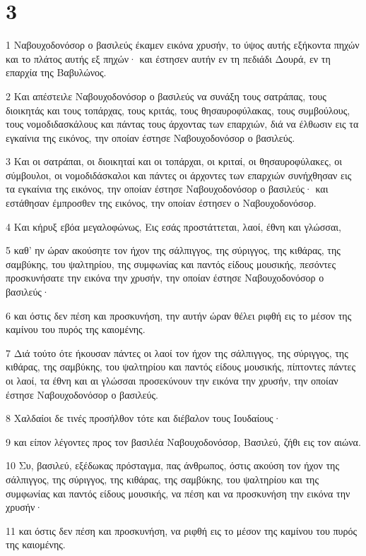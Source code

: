 \chapter{3}

\par 1 Ναβουχοδονόσορ ο βασιλεύς έκαμεν εικόνα χρυσήν, το ύψος αυτής εξήκοντα πηχών και το πλάτος αυτής εξ πηχών· και έστησεν αυτήν εν τη πεδιάδι Δουρά, εν τη επαρχία της Βαβυλώνος.
\par 2 Και απέστειλε Ναβουχοδονόσορ ο βασιλεύς να συνάξη τους σατράπας, τους διοικητάς και τους τοπάρχας, τους κριτάς, τους θησαυροφύλακας, τους συμβούλους, τους νομοδιδασκάλους και πάντας τους άρχοντας των επαρχιών, διά να έλθωσιν εις τα εγκαίνια της εικόνος, την οποίαν έστησε Ναβουχοδονόσορ ο βασιλεύς.
\par 3 Και οι σατράπαι, οι διοικηταί και οι τοπάρχαι, οι κριταί, οι θησαυροφύλακες, οι σύμβουλοι, οι νομοδιδάσκαλοι και πάντες οι άρχοντες των επαρχιών συνήχθησαν εις τα εγκαίνια της εικόνος, την οποίαν έστησε Ναβουχοδονόσορ ο βασιλεύς· και εστάθησαν έμπροσθεν της εικόνος, την οποίαν έστησεν ο Ναβουχοδονόσορ.
\par 4 Και κήρυξ εβόα μεγαλοφώνως, Εις εσάς προστάττεται, λαοί, έθνη και γλώσσαι,
\par 5 καθ' ην ώραν ακούσητε τον ήχον της σάλπιγγος, της σύριγγος, της κιθάρας, της σαμβύκης, του ψαλτηρίου, της συμφωνίας και παντός είδους μουσικής, πεσόντες προσκυνήσατε την εικόνα την χρυσήν, την οποίαν έστησε Ναβουχοδονόσορ ο βασιλεύς·
\par 6 και όστις δεν πέση και προσκυνήση, την αυτήν ώραν θέλει ριφθή εις το μέσον της καμίνου του πυρός της καιομένης.
\par 7 Διά τούτο ότε ήκουσαν πάντες οι λαοί τον ήχον της σάλπιγγος, της σύριγγος, της κιθάρας, της σαμβύκης, του ψαλτηρίου και παντός είδους μουσικής, πίπτοντες πάντες οι λαοί, τα έθνη και αι γλώσσαι προσεκύνουν την εικόνα την χρυσήν, την οποίαν έστησε Ναβουχοδονόσορ ο βασιλεύς.
\par 8 Χαλδαίοι δε τινές προσήλθον τότε και διέβαλον τους Ιουδαίους·
\par 9 και είπον λέγοντες προς τον βασιλέα Ναβουχοδονόσορ, Βασιλεύ, ζήθι εις τον αιώνα.
\par 10 Συ, βασιλεύ, εξέδωκας πρόσταγμα, πας άνθρωπος, όστις ακούση τον ήχον της σάλπιγγος, της σύριγγος, της κιθάρας, της σαμβύκης, του ψαλτηρίου και της συμφωνίας και παντός είδους μουσικής, να πέση και να προσκυνήση την εικόνα την χρυσήν·
\par 11 και όστις δεν πέση και προσκυνήση, να ριφθή εις το μέσον της καμίνου του πυρός της καιομένης.
